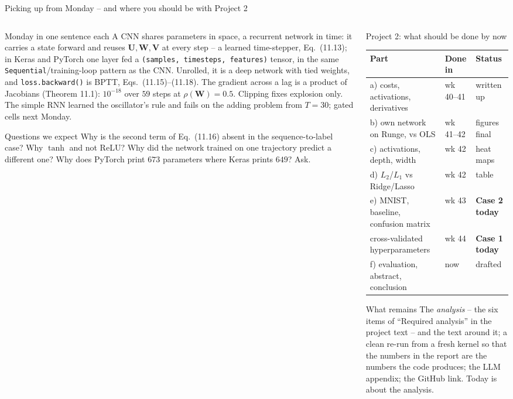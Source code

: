 \documentclass[10pt,aspectratio=169]{beamer}
\newcounter{case}
\begin{document}
\begin{frame}{Picking up from Monday -- and where you should be with Project 2}
\footnotesize
\begin{columns}[T]
\begin{column}{0.44\textwidth}
\begin{block}{Monday in one sentence each}
\scriptsize
A CNN shares parameters in space, a recurrent network in time: it carries
a state forward and reuses $\bm{U},\bm{W},\bm{V}$ at every step -- a
learned time-stepper, Eq.~(11.13); in Keras and PyTorch one layer fed a
\texttt{(samples, timesteps, features)} tensor, in the same
\texttt{Sequential}/training-loop pattern as the CNN.  Unrolled, it is a
deep network with tied weights, and \texttt{loss.backward()} is BPTT,
Eqs.~(11.15)--(11.18).  The gradient across a lag is a product of Jacobians
(Theorem 11.1): $10^{-18}$ over $59$ steps at $\rho(\bm{W})=0.5$.  Clipping
fixes explosion only.  The simple RNN learned the oscillator's rule and
fails on the adding problem from $T=30$; gated cells next Monday.
\end{block}
\begin{block}{Questions we expect}
\scriptsize
Why is the second term of Eq.~(11.16) absent in the sequence-to-label case?
Why $\tanh$ and not ReLU?  Why did the network trained on one trajectory
predict a different one?  Why does PyTorch print $673$ parameters where
Keras prints $649$?  Ask.
\end{block}
\end{column}
\begin{column}{0.54\textwidth}
\begin{block}{Project 2: what should be done by now}
\scriptsize
\setlength{\tabcolsep}{3pt}
\begin{tabular}{@{}lll@{}}
\toprule
Part & Done in & Status\\
\midrule
a) costs, activations, derivatives & wk 40--41 & written up\\
b) own network on Runge, vs OLS & wk 41--42 & figures final\\
c) activations, depth, width & wk 42 & heat maps\\
d) $L_2$/$L_1$ vs Ridge/Lasso & wk 42 & table\\
e) MNIST, baseline, confusion matrix & wk 43 & \textbf{Case 2 today}\\
cross-validated hyperparameters & wk 44 & \textbf{Case 1 today}\\
f) evaluation, abstract, conclusion & now & drafted\\
\bottomrule
\end{tabular}
\end{block}
\begin{block}{What remains}
\scriptsize
The \emph{analysis} -- the six items of ``Required analysis'' in the project
text -- and the text around it; a clean re-run from a fresh kernel so that
the numbers in the report are the numbers the code produces; the LLM
appendix; the GitHub link.  Today is about the analysis.
\end{block}
\end{column}
\end{columns}
\end{frame}
\end{document}
